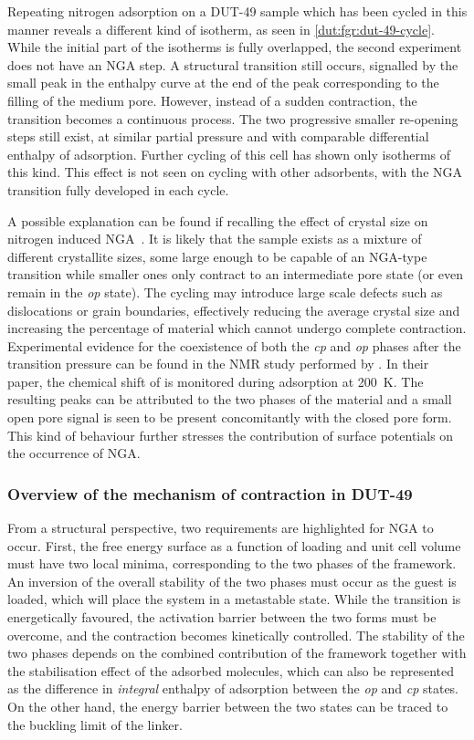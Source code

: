 Repeating nitrogen adsorption on a DUT-49 sample which has been
cycled in this manner reveals a different kind of isotherm, 
as seen in \autoref{dut:fgr:dut-49-cycle}. While the initial 
part of the isotherms is fully overlapped,
the second experiment does not have an NGA step. 
A structural transition still occurs, 
signalled by the small peak in the enthalpy curve at the end of the 
peak corresponding to the filling of the medium pore. However, instead
of a sudden contraction, the transition becomes a continuous 
process. The two progressive smaller re-opening steps still exist,
at similar partial pressure and with comparable differential enthalpy
of adsorption. Further cycling of this cell has shown only isotherms
of this kind. This effect is not seen on cycling with other 
adsorbents, with the NGA transition fully developed in each cycle. 

A possible explanation can be found if recalling the effect 
of crystal size on nitrogen induced 
NGA~\cite{krauseEffectCrystalliteSize2018}. It is likely 
that the sample exists as a mixture of different crystallite
sizes, some large enough to be capable of an NGA-type transition 
while smaller ones only contract to an intermediate pore state
(or even remain in the \textit{op} state).
The cycling may introduce large scale defects such as dislocations
or grain boundaries, effectively reducing the average crystal size
and increasing the percentage of material which cannot undergo 
complete contraction. 
Experimental evidence for the coexistence of both the \textit{cp} and 
\textit{op} phases after the transition pressure can be found in the 
 NMR study performed 
by \citet{schaberSituMonitoringUnique2017}. In their paper,
the chemical shift of  is monitored during
adsorption at \SI{200}{\kelvin}. The resulting peaks can be attributed
to the two phases of the material and a small
open pore signal is seen to be present concomitantly with the 
closed pore form.
This kind of behaviour further stresses the 
contribution of surface potentials on the occurrence of NGA.

\subsubsection{Overview of the mechanism of contraction in DUT-49}

From a structural perspective, two requirements are 
highlighted for NGA to occur.
First, the free energy surface as a function of loading and 
unit cell volume must have two local minima, corresponding to the 
two phases of the framework. An inversion of the overall stability
of the two phases must occur as the guest is loaded, which will 
place the system in a metastable state. While the transition
is energetically favoured, the activation barrier between the 
two forms must be overcome, and the contraction becomes 
kinetically controlled. The stability of the two phases 
depends on the combined contribution of the framework together
with the stabilisation effect of the adsorbed molecules,
which can also be represented as the
difference in \textit{integral} enthalpy of adsorption between the 
\textit{op} and \textit{cp} states. On the other hand, the 
energy barrier between the two states can be traced to the 
buckling limit of the linker.
